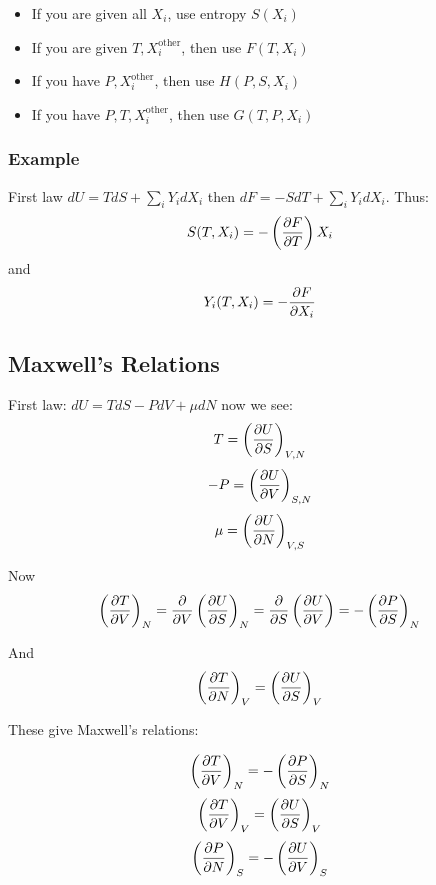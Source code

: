 \begin{itemize}
\item If you are given all $X_i$, use entropy $S(X_i)$
\item If you are given $T, X_i^{\text{other}}$, then use $F(T, X_i)$
\item If you have $P, X_i^{\text{other}}$, then use $H(P,S,X_i)$
\item If you have $P, T, X_i^{\text{other}}$, then use $G(T, P, X_i)$
\end{itemize}

\subsubsection*{Example}

First law $dU = TdS + \sum_i Y_i dX_i$ then $dF = -SdT + \sum_i Y_i dX_i$. Thus: $$S(T, X_i) = - \left(\dfrac{\partial F}{\partial T}\right)X_i$$ and $$Y_i(T,X_i) = - \dfrac{\partial F}{\partial X_i}$$

\subsection{Maxwell's Relations}

First law: $dU = TdS - PdV + \mu dN$ now we see: $$T = \left(\dfrac{\partial U}{\partial S}\right)_{V,N}$$
$$-P = \left(\dfrac{\partial U}{\partial V}\right)_{S,N}$$
$$\mu = \left(\dfrac{\partial U}{\partial N}\right)_{V,S}$$

Now $$\left(\dfrac{\partial T}{\partial V}\right)_N = \dfrac{\partial }{\partial V}\left(\dfrac{\partial U}{\partial S}\right)_N = \dfrac{\partial }{\partial S} \left(\dfrac{\partial U}{\partial V}\right) = - \left(\dfrac{\partial P}{\partial S}\right)_N$$

And $$\left(\dfrac{\partial T}{\partial N}\right)_V = \left(\dfrac{\partial U}{\partial S}\right)_V$$

These give Maxwell's relations:

\begin{equation}
\left(\dfrac{\partial T}{\partial V}\right)_N = - \left(\dfrac{\partial P}{\partial S}\right)_N
\end{equation}
\begin{equation}
\left(\dfrac{\partial T}{\partial V}\right)_V = \left(\dfrac{\partial U}{\partial S}\right)_V
\end{equation}
\begin{equation}
\left(\dfrac{\partial P}{\partial N}\right)_S = - \left(\dfrac{\partial U}{\partial V}\right)_S
\end{equation}